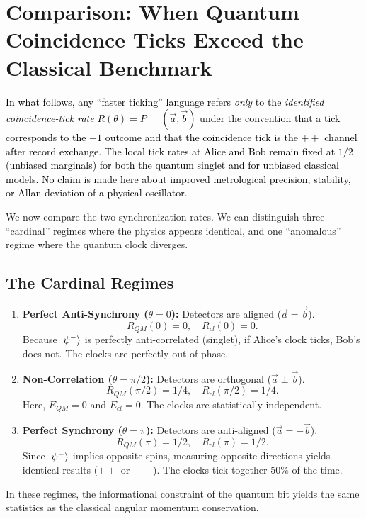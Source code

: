 \documentclass[reprint,aps,pra,longbibliography]{revtex4-2}
\newcommand{\rev}[1]{\textcolor{black}{#1}} %
\begin{document}
\section{Comparison: When Quantum Coincidence Ticks Exceed the Classical Benchmark}
\label{sec:comparison}

\rev{In what follows, any ``faster ticking'' language refers \emph{only} to the \emph{identified coincidence-tick rate} $R(\theta)=P_{++}(\vec a,\vec b)$ under the convention that a tick corresponds to the $+1$ outcome and that the coincidence tick is the $++$ channel after record exchange. The local tick rates at Alice and Bob remain fixed at $1/2$ (unbiased marginals) for both the quantum singlet and for unbiased classical models. No claim is made here about improved metrological precision, stability, or Allan deviation of a physical oscillator.}

We now compare the two synchronization rates. We can distinguish three ``cardinal'' regimes where the physics appears identical, and one ``anomalous'' regime where the quantum clock diverges.

\subsection{The Cardinal Regimes}
\begin{enumerate}
    \item \textbf{Perfect Anti-Synchrony ($\theta=0$):} Detectors are aligned ($\vec{a} = \vec{b}$).
    \[
    R_{QM}(0) = 0, \quad R_{cl}(0) = 0.
    \]
    Because $\ket{\psi^-}$ is perfectly anti-correlated (singlet), if Alice's clock ticks, Bob's does not. The clocks are perfectly out of phase.

    \item \textbf{Non-Correlation ($\theta=\pi/2$):} Detectors are orthogonal ($\vec{a} \perp \vec{b}$).
    \[
    R_{QM}(\pi/2) = 1/4, \quad R_{cl}(\pi/2) = 1/4.
    \]
    Here, $E_{QM} = 0$ and $E_{cl} = 0$. The clocks are statistically independent.

    \item \textbf{Perfect Synchrony ($\theta=\pi$):} Detectors are anti-aligned ($\vec{a} = -\vec{b}$).
    \[
    R_{QM}(\pi) = 1/2, \quad R_{cl}(\pi) = 1/2.
    \]
    Since $\ket{\psi^-}$ implies opposite spins, measuring opposite directions yields identical results ($++$ or $--$). The clocks tick together $50\%$ of the time.
\end{enumerate}
In these regimes, the informational constraint of the quantum bit yields the same statistics as the classical angular momentum conservation.
\end{document}
